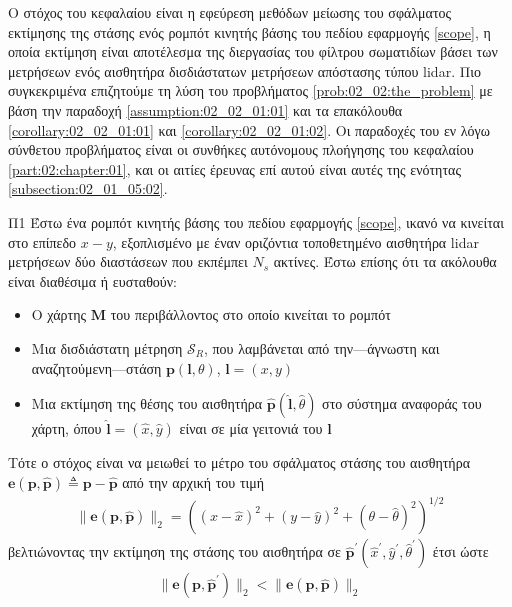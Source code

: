 Ο στόχος του κεφαλαίου είναι η εφεύρεση μεθόδων μείωσης του σφάλματος εκτίμησης
της στάσης ενός ρομπότ κινητής βάσης του πεδίου εφαρμογής \ref{scope}, η οποία
εκτίμηση είναι αποτέλεσμα της διεργασίας του φίλτρου σωματιδίων βάσει των
μετρήσεων ενός αισθητήρα δισδιάστατων μετρήσεων απόστασης τύπου lidar. Πιο
συγκεκριμένα επιζητούμε τη λύση του προβλήματος \ref{prob:02_02:the_problem}
με βάση την παραδοχή \ref{assumption:02_02_01:01} και τα επακόλουθα
\ref{corollary:02_02_01:01} και \ref{corollary:02_02_01:02}. Οι παραδοχές
του εν λόγω σύνθετου προβλήματος είναι οι συνθήκες αυτόνομους πλοήγησης
του κεφαλαίου \ref{part:02:chapter:01}, και οι αιτίες έρευνας επί αυτού
είναι αυτές της ενότητας \ref{subsection:02_01_05:02}.

\begin{bw_box}
\begin{customproblem}{Π1}
  \label{prob:02_02:the_problem}
  Έστω ένα ρομπότ κινητής βάσης του πεδίου εφαρμογής \ref{scope}, ικανό να
  κινείται στο επίπεδο $x-y$, εξοπλισμένο με έναν οριζόντια τοποθετημένο
  αισθητήρα lidar μετρήσεων δύο διαστάσεων που εκπέμπει $N_s$ ακτίνες. Έστω
  επίσης ότι τα ακόλουθα είναι διαθέσιμα ή ευσταθούν:
  \begin{itemize}
    \item Ο χάρτης $\bm{M}$ του περιβάλλοντος στο οποίο κινείται το ρομπότ
    \item Μια δισδιάστατη μέτρηση $\mathcal{S}_R$, που λαμβάνεται από
          την---άγνωστη και αναζητούμενη---στάση $\bm{p}(\bm{l},\theta)$,
          $\bm{l} = (x,y)$
    \item Μια εκτίμηση της θέσης του αισθητήρα
          $\hat{\bm{p}}(\hat{\bm{l}}, \hat{\theta})$ στο σύστημα αναφοράς του
          χάρτη, όπου $\hat{\bm{l}} = (\hat{x}, \hat{y})$ είναι σε μία γειτονιά
          του $\bm{l}$
  \end{itemize}
\end{customproblem}
Τότε ο στόχος είναι να μειωθεί το μέτρο του σφάλματος στάσης του αισθητήρα
$\bm{e}(\bm{p}, \hat{\bm{p}}) \triangleq \bm{p}- \hat{\bm{p}}$ από την αρχική
του τιμή
\begin{align}
  \|\bm{e}(\bm{p}, \hat{\bm{p}})\|_2 = ((x- \hat{x})^2 + (y- \hat{y})^2 + (\theta- \hat{\theta})^2)^{1/2}
  \label{eq:pose_error_def}
\end{align}
βελτιώνοντας την εκτίμηση της στάσης του αισθητήρα σε
$\hat{\bm{p}}^\prime(\hat{x}^\prime, \hat{y}^\prime, \hat{\theta}^\prime)$ έτσι ώστε
\begin{align}
  \|\bm{e}(\bm{p}, \hat{\bm{p}}^\prime)\|_2 < \|\bm{e}(\bm{p}, \hat{\bm{p}})\|_2
  \tag{$\ast$}
  \label{obj:the_objective}
\end{align}
\end{bw_box}

